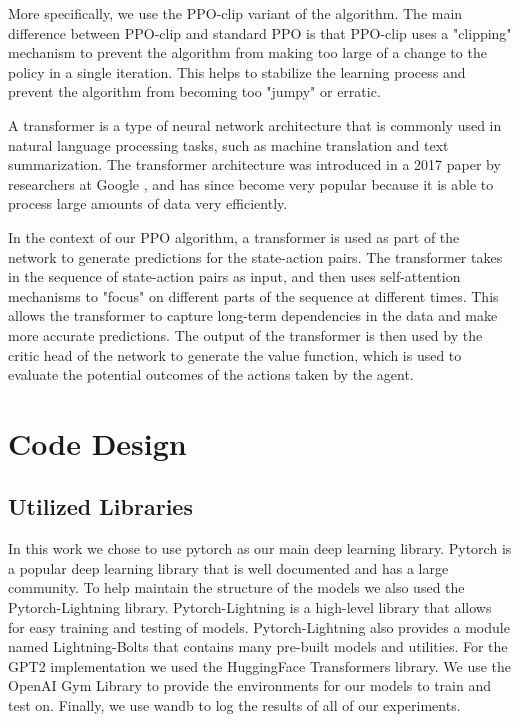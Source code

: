 More specifically, we use the PPO-clip variant of the algorithm.
The main difference between PPO-clip and standard PPO is that PPO-clip uses a "clipping"
mechanism to prevent the algorithm from making too large of a change to the policy in a single iteration.
This helps to stabilize the learning process and prevent the algorithm from becoming too "jumpy" or erratic.

A transformer is a type of neural network architecture that is commonly used in natural language processing tasks,
such as machine translation and text summarization.
The transformer architecture was introduced in a 2017 paper by researchers at Google \cite{attentionisallyouneed},
and has since become very popular because it is able to process large amounts of data very efficiently.

In the context of our PPO algorithm, a transformer is used as part of the network to generate predictions for the state-action pairs.
The transformer takes in the sequence of state-action pairs as input, and then uses self-attention mechanisms to "focus"
on different parts of the sequence at different times. This allows the transformer to capture long-term dependencies
in the data and make more accurate predictions.
The output of the transformer is then used by the critic head of the network to generate the value function,
which is used to evaluate the potential outcomes of the actions taken by the agent.



\section{Code Design}

\subsection{Utilized Libraries}
In this work we chose to use pytorch as our main deep learning library. Pytorch is a popular deep learning library that is well documented and has a large community.
To help maintain the structure of the models we also used the Pytorch-Lightning library.
Pytorch-Lightning is a high-level library that allows for easy training and testing of models.
Pytorch-Lightning also provides a module named Lightning-Bolts that contains many pre-built models and utilities.
For the GPT2 implementation we used the HuggingFace Transformers library.
We use the OpenAI Gym Library to provide the environments for our models to train and test on\cite{brockman2016openai}.
Finally, we use wandb to log the results of all of our experiments\cite{wandb}.

